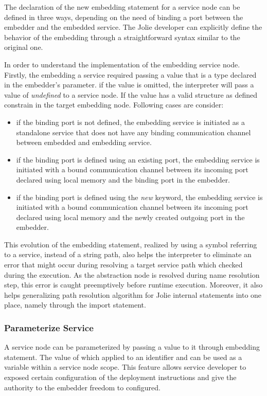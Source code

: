 The declaration of the new embedding statement for a service node can be defined in three ways, depending on the need of binding a port between the embedder and the embedded service. The Jolie developer can explicitly define the behavior of the embedding through a straightforward syntax similar to the original one.

In order to understand the implementation of the embedding service node. Firstly, the embedding a service required passing a value that is a type declared in the embedder's parameter. if the value is omitted, the interpreter will pass a value of \textit{undefined} to a service node. If the value has a valid structure as defined constrain in the target embedding node. Following cases are consider:

\begin{itemize}
    \item if the binding port is not defined, the embedding service is initiated as a standalone service that does not have any binding communication channel between embedded and embedding service.
    \item if the binding port is defined using an existing port, the embedding service is initiated with a bound communication channel between its incoming port declared using local memory and the binding port in the embedder.
    \item if the binding port is defined using the \textit{new} keyword, the embedding service is initiated with a bound communication channel between its incoming port declared using local memory and the newly created outgoing port in the embedder.
\end{itemize}

This evolution of the embedding statement, realized by using a symbol referring to a service, instead of a string path, also helps the interpreter to eliminate an error that might occur during resolving a target service path which checked during the execution. As the abstraction node is resolved during name resolution step, this error is caught preemptively before runtime execution. Moreover, it also helps generalizing path resolution algorithm for Jolie internal statements into one place, namely through the import statement.

\subsubsection{Parameterize Service}

A service node can be parameterized by passing a value to it through embedding statement. The value of which applied to an identifier and can be used as a variable within a service node scope. This feature allows service developer to exposed certain configuration of the deployment instructions and give the authority to the embedder freedom to configured.

